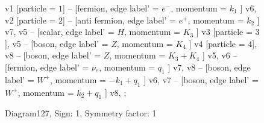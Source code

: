 \documentclass{revtex4}
\begin{document}
\begin{figure}[!htb]
\begin{center}
{    %
v1 [particle = \(1\)] -- [fermion, edge label' = \(e^{-}\), momentum = \(k_{1}\) ] v6, 
v2 [particle = \(2\)] -- [anti fermion, edge label' = \(e^{+}\), momentum = \(k_{2}\) ] v7, 
v5 -- [scalar, edge label' = \(H\), momentum = \(K_{3}\) ] v3 [particle = \(3\)], 
v5 -- [boson, edge label' = \(Z\), momentum = \(K_{4}\) ] v4 [particle = \(4\)], 
v8 -- [boson, edge label' = \(Z\), momentum = \(K_{3} + K_{4}\) ] v5, 
v6 -- [fermion, edge label' = \(\nu_{e}\), momentum = \(q_{1}\) ] v7, 
v8 -- [boson, edge label' = \(W^{+}\), momentum = \(-k_{1} + q_{1}\) ] v6, 
v7 -- [boson, edge label' = \(W^{+}\), momentum = \(k_{2} + q_{1}\) ] v8, 
};
\end{center}
\caption{Diagram127, Sign: 1, Symmetry factor: 1}
\end{figure}
\newpage
\end{document}
